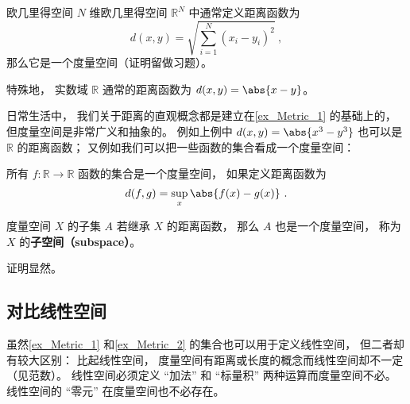 \begin{example}{欧几里得空间}\label{ex_Metric_1}
$N$ 维欧几里得空间 $\mathbb R^N$ 中通常定义距离函数为
\begin{equation}\label{eq_Metric_1}
d(x, y) = \sqrt{\sum_{i=1}^N (x_i - y_i)^2}~,
\end{equation}
那么它是一个度量空间（证明留做习题）。

特殊地， 实数域 $\mathbb R$ 通常的距离函数为 $d(x, y) = \abs{x - y}$。
\end{example}

日常生活中， 我们关于距离的直观概念都是建立在\autoref{ex_Metric_1} 的基础上的， 但度量空间是非常广义和抽象的。 例如上例中 $d(x, y) = \abs{x^3 - y^3}$ 也可以是 $\mathbb R$ 的距离函数； 又例如我们可以把一些函数的集合看成一个度量空间：
\begin{example}{}\label{ex_Metric_2}
所有 $f:\mathbb R \to \mathbb R$ 函数的集合是一个度量空间， 如果定义距离函数为
\begin{equation}
d(f, g) = \sup_x{\abs{f(x) - g(x)}}~.
\end{equation}
\end{example}



\begin{corollary}{}
度量空间 $X$ 的子集 $A$ 若继承 $X$ 的距离函数， 那么 $A$ 也是一个度量空间， 称为 $X$ 的\textbf{子空间（subspace）}。
\end{corollary}
证明显然。

\subsection{对比线性空间}
虽然\autoref{ex_Metric_1} 和\autoref{ex_Metric_2} 的集合也可以用于定义线性空间， 但二者却有较大区别： 比起线性空间， 度量空间有距离或长度的概念而线性空间却不一定（见范数）。 线性空间必须定义 “加法” 和 “标量积” 两种运算而度量空间不必。 线性空间的 “零元” 在度量空间也不必存在。
